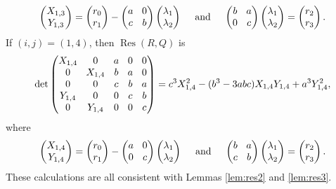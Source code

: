 \documentclass[JEP,XML,SOM,Unicode]{cedram}
\DeclareMathOperator{\Res}{Res}
\begin{document}
\[\arraycolsep4.5pt
\begin{pmatrix}
X_{1,3}\\
Y_{1,3}\end{pmatrix}
=\begin{pmatrix}
r_0\\
r_1\end{pmatrix}
-\begin{pmatrix}
a & 0 \\
c & b
\end{pmatrix}\begin{pmatrix}
\lambda_1 \\
\lambda_2 \end{pmatrix}\quad\text{ and }\quad\begin{pmatrix}
b & a \\
0 & c
\end{pmatrix}\begin{pmatrix}
\lambda_1 \\
\lambda_2
\end{pmatrix}=\begin{pmatrix}
r_2 \\
r_3
\end{pmatrix}.
\]
If $(i,j)=(1,4)$, then $\Res(R,Q)$ is
\[\arraycolsep4.5pt
\det\begin{pmatrix}
X_{1,4} & 0 & a& 0& 0 \\
0 & X_{1,4}& b& a& 0 \\
0 & 0& c& b& a \\
Y_{1,4} & 0& 0& c& b \\
0 & Y_{1,4}& 0& 0& c \\
\end{pmatrix}=c^3 X_{1,4}^2 - (b^3 - 3 a b c) X_{1,4} Y_{1,4} + a^3 Y_{1,4}^2,
\]
where
\[\arraycolsep4.5pt
\begin{pmatrix}
X_{1,4}\\
Y_{1,4}\end{pmatrix}
=\begin{pmatrix}
r_0\\
r_1\end{pmatrix}
-\begin{pmatrix}
a & 0 \\
0 & c
\end{pmatrix}\begin{pmatrix}
\lambda_1 \\
\lambda_2
\end{pmatrix}\quad\text{ and }\quad\begin{pmatrix}
b & a \\
c & b
\end{pmatrix}\begin{pmatrix}
\lambda_1 \\
\lambda_2
\end{pmatrix}=\begin{pmatrix}
r_2 \\
r_3
\end{pmatrix}.
\]
These calculations are all consistent with Lemmas \ref{lem:res2} and \ref{lem:res3}.
\end{document}
